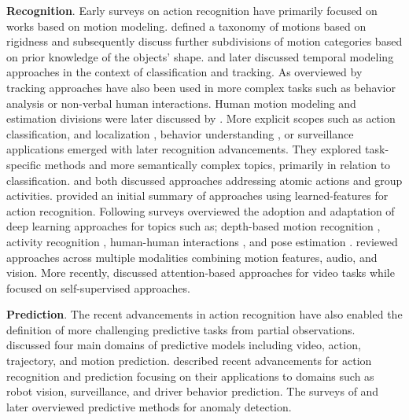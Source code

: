 \documentclass[smallextended,twocolumn,natbib]{svjour3}
\begin{document}
\noindent
\textbf{Recognition}. Early surveys on action recognition have primarily focused on works based on motion modeling. \citet{aggarwal1994articulated} defined a taxonomy of motions based on rigidness and subsequently \citep{aggarwal1998nonrigid} discuss further subdivisions of motion categories based on prior knowledge of the objects' shape. \citet{cedras1995motion} and later \citet{moeslund2001survey} discussed temporal modeling approaches in the context of classification and tracking. As overviewed by \citet{buxton2003learning} tracking approaches have also been used in more complex tasks such as behavior analysis or non-verbal human interactions. Human motion modeling and estimation divisions were later discussed by \citet{poppe2007vision}. 
More explicit scopes such as action classification, and localization \citep{weinland2011survey}, behavior understanding \citep{chaaraoui2012review}, or surveillance applications \citep{vishwakarma2013survey} emerged with later recognition advancements. They explored task-specific methods and more semantically complex topics, primarily in relation to classification. \citet{turaga2008machine} and \citet{poppe2010survey} both discussed approaches addressing atomic actions and group activities. \citet{herath2017going} provided an initial summary of approaches using learned-features for action recognition. Following surveys overviewed the adoption and adaptation of deep learning approaches for topics such as; depth-based motion recognition \citep{wang2018rgb}, activity recognition \citep{beddiar2020vision}, human-human interactions \citep{stergiou2019analyzing}, and pose estimation \citep{zheng2020deep}. \citet{sun2022human} reviewed approaches across multiple modalities combining motion features, audio, and vision. More recently, \citet{selva2023video} discussed attention-based approaches for video tasks while \citet{schiappa2023self} focused on self-supervised approaches.

\noindent
\textbf{Prediction}. The recent advancements in action recognition have also enabled the definition of more challenging predictive tasks from partial observations. \citet{rasouli2020deep} discussed four main domains of predictive models including video, action, trajectory, and motion prediction. \citet{kong2022human} described recent advancements for action recognition and prediction focusing on their applications to domains such as robot vision, surveillance, and driver behavior prediction. The surveys of \citet{dhiman2019review} and later \citet{ramachandra2020survey} overviewed predictive methods for anomaly detection.
\end{document}

